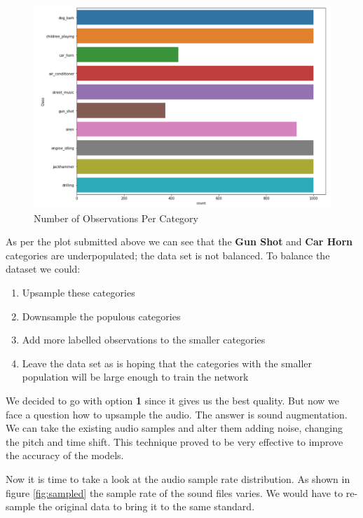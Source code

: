 \begin{Schunk}
\begin{figure}[H]

{\centering \includegraphics[width=0.7\linewidth]{../images/classPopulation} 

}

\caption[Number of Observations Per Category]{Number of Observations Per Category}\label{fig:unnamed-chunk-3}
\end{figure}
\end{Schunk}

As per the plot submitted above we can see that the \textbf{Gun Shot}
and \textbf{Car Horn} categories are underpopulated; the data set is not
balanced. To balance the dataset we could:

\begin{enumerate}
\def\labelenumi{\arabic{enumi}.}
\tightlist
\item
  Upsample these categories
\item
  Downsample the populous categories
\item
  Add more labelled observations to the smaller categories
\item
  Leave the data set as is hoping that the categories with the smaller
  population will be large enough to train the network
\end{enumerate}

We decided to go with option \textbf{1} since it gives us the best
quality. But now we face a question how to upsample the audio. The
answer is sound augmentation. We can take the existing audio samples and
alter them adding noise, changing the pitch and time shift. This
technique proved to be very effective to improve the accuracy of the
models.

Now it is time to take a look at the audio sample rate distribution. As
shown in figure \ref{fig:sampled} the sample rate of the sound files
varies. We would have to re-sample the original data to bring it to the
same standard.

